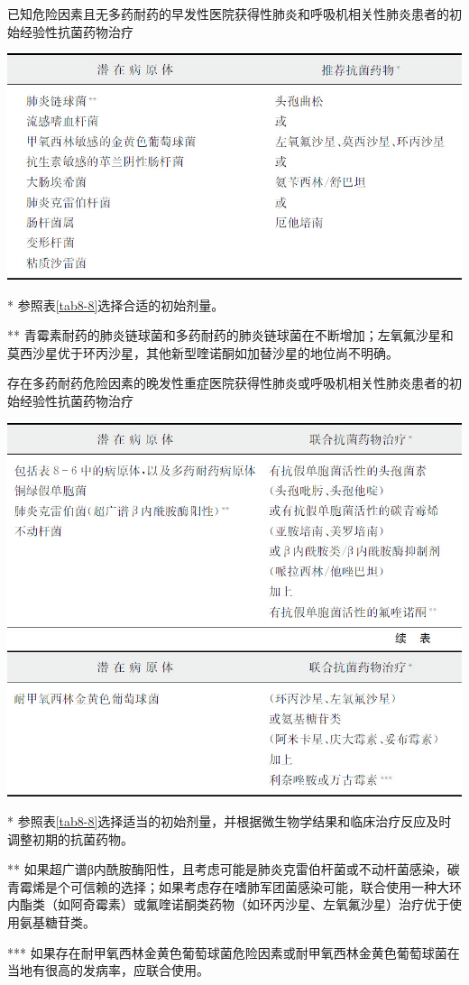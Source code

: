 \begin{table}[htbp]
{\centering
\caption{已知危险因素且无多药耐药的早发性医院获得性肺炎和呼吸机相关性肺炎患者的初始经验性抗菌药物治疗}
\label{tab8-6}
\includegraphics{./images/Image00065.jpg}}

\footnotesize 
* 参照表\ref{tab8-8}选择合适的初始剂量。

**
青霉素耐药的肺炎链球菌和多药耐药的肺炎链球菌在不断增加；左氧氟沙星和莫西沙星优于环丙沙星，其他新型喹诺酮如加替沙星的地位尚不明确。
\end{table}



\begin{table}[htbp]
{\centering
\caption{存在多药耐药危险因素的晚发性重症医院获得性肺炎或呼吸机相关性肺炎患者的初始经验性抗菌药物治疗}
\label{tab8-7}
\includegraphics{./images/Image00066.jpg}
\includegraphics{./images/Image00067.jpg}
}

\footnotesize
*
参照表\ref{tab8-8}选择适当的初始剂量，并根据微生物学结果和临床治疗反应及时调整初期的抗菌药物。

**
如果超广谱β内酰胺酶阳性，且考虑可能是肺炎克雷伯杆菌或不动杆菌感染，碳青霉烯是个可信赖的选择；如果考虑存在嗜肺军团菌感染可能，联合使用一种大环内酯类（如阿奇霉素）或氟喹诺酮类药物（如环丙沙星、左氧氟沙星）治疗优于使用氨基糖苷类。

***
如果存在耐甲氧西林金黄色葡萄球菌危险因素或耐甲氧西林金黄色葡萄球菌在当地有很高的发病率，应联合使用。
\end{table}





